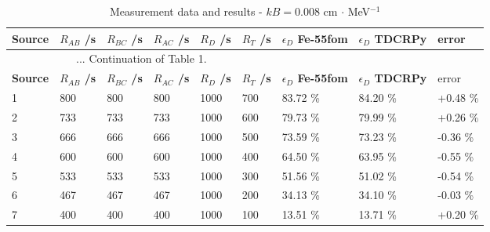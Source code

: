 \documentclass[12pt]{iopart}
\begin{document}
\begingroup
\footnotesize
\begin{longtable}[l]{| p{} | p{} | p{} | p{} | p{} | p{} |p{} |p{} |p{} |} 
\caption{Measurement data and results - $kB = 0.008$ cm $\cdot$ MeV$^{-1}$}
\label{Table1} \\ 
\hline
\textbf{Source} & \textbf{$R_{AB}$ /s} & \textbf{$R_{BC}$ /s} & \textbf{$R_{AC}$ /s} & \textbf{$R_{D}$ /s} & \textbf{$R_{T}$ /s} & \textbf{$\epsilon_{D}$ Fe-55fom} & \textbf{$\epsilon_{D}$ TDCRPy} & error \\ 
\endfirsthead
\multicolumn{6}{c}{... Continuation of Table 1.}\\ 
\hline
 \textbf{Source} & \textbf{$R_{AB}$ /s} & \textbf{$R_{BC}$ /s} & \textbf{$R_{AC}$ /s} & \textbf{$R_{D}$ /s} & \textbf{$R_{T}$ /s} & \textbf{$\epsilon_{D}$ Fe-55fom} & \textbf{$\epsilon_{D}$ TDCRPy} & error \\   \hline 
\endhead
\hline
 1 & 800    & 800     & 800    & 1000    &  700   &  83.72 \% &  84.20 \% &  +0.48 \% \\
 2 & 733    & 733     & 733    & 1000    &  600   &  79.73 \% &  79.99 \% &  +0.26 \% \\
 3 & 666    & 666     & 666    & 1000    &  500   &  73.59 \% &  73.23 \% &  -0.36 \% \\
 4 & 600    & 600     & 600    & 1000    &  400   &  64.50 \% &  63.95 \% &  -0.55 \% \\
 5 & 533    & 533     & 533    & 1000    &  300   &  51.56 \% &  51.02 \% &  -0.54 \% \\
 6 & 467    & 467     & 467    & 1000    &  200   &  34.13 \% &  34.10 \% &  -0.03 \% \\
 7 & 400    & 400     & 400    & 1000    &  100   &  13.51 \% &  13.71 \% &  +0.20 \% \\
\hline
\end{longtable} 
\endgroup

\pagebreak
\end{document}
